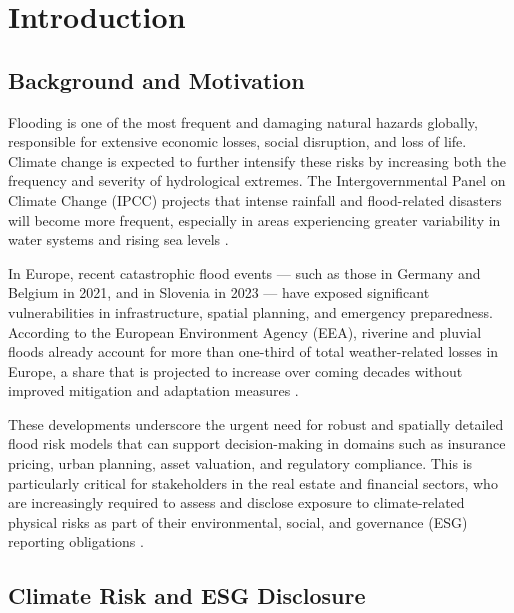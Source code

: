 \chapter{Introduction}

\section{Background and Motivation}

Flooding is one of the most frequent and damaging natural hazards globally, responsible for extensive economic losses, social disruption, and loss of life. Climate change is expected to further intensify these risks by increasing both the frequency and severity of hydrological extremes. The Intergovernmental Panel on Climate Change (IPCC) projects that intense rainfall and flood-related disasters will become more frequent, especially in areas experiencing greater variability in water systems and rising sea levels \cite{ipcc2021}.

In Europe, recent catastrophic flood events — such as those in Germany and Belgium in 2021, and in Slovenia in 2023 — have exposed significant vulnerabilities in infrastructure, spatial planning, and emergency preparedness. According to the European Environment Agency (EEA), riverine and pluvial floods already account for more than one-third of total weather-related losses in Europe, a share that is projected to increase over coming decades without improved mitigation and adaptation measures \cite{eea2020floods}.

These developments underscore the urgent need for robust and spatially detailed flood risk models that can support decision-making in domains such as insurance pricing, urban planning, asset valuation, and regulatory compliance. This is particularly critical for stakeholders in the real estate and financial sectors, who are increasingly required to assess and disclose exposure to climate-related physical risks as part of their environmental, social, and governance (ESG) reporting obligations \cite{ecb2020, tcfd2017}.


\section{Climate Risk and ESG Disclosure}

